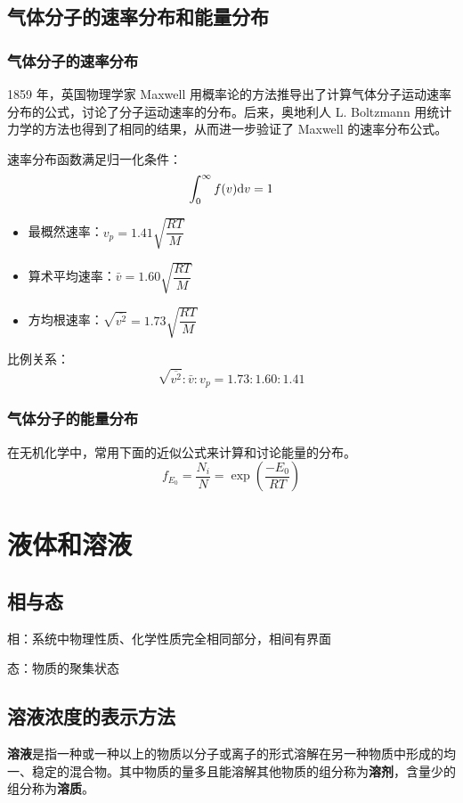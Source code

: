 \subsection{气体分子的速率分布和能量分布}
\subsubsection{气体分子的速率分布}
1859 年，英国物理学家 Maxwell 用概率论的方法推导出了计算气体分子运动速率分布的公式，讨论了分子运动速率的分布。后来，奥地利人 L. Boltzmann 用统计力学的方法也得到了相同的结果，从而进一步验证了 Maxwell 的速率分布公式。

速率分布函数满足归一化条件：$$\int_{0}^{\infty} f(v) {\rm d}v = 1$$

\begin{itemize}
    \item 最概然速率：$v_p = 1.41\sqrt{\dfrac{RT}{M}}$
    \item 算术平均速率：$\bar{v} = 1.60\sqrt{\dfrac{RT}{M}}$
    \item 方均根速率：$\sqrt{\overline{v^2}} = 1.73\sqrt{\dfrac{RT}{M}}$
\end{itemize}

比例关系：$$\sqrt{\overline{v^2}}:\bar{v}:v_p = 1.73:1.60:1.41$$

\subsubsection{气体分子的能量分布}
在无机化学中，常用下面的近似公式来计算和讨论能量的分布。
\[
f_{E_0}=\dfrac{N_i}{N}=\exp{\left(\dfrac{-E_0}{RT}\right)}
\]

\section{液体和溶液}

\subsection{相与态}

相：系统中物理性质、化学性质完全相同部分，相间有界面

态：物质的聚集状态

\subsection{溶液浓度的表示方法}

\textbf{溶液}是指一种或一种以上的物质以分子或离子的形式溶解在另一种物质中形成的均一、稳定的混合物。其中物质的量多且能溶解其他物质的组分称为\textbf{溶剂}，含量少的组分称为\textbf{溶质}。

